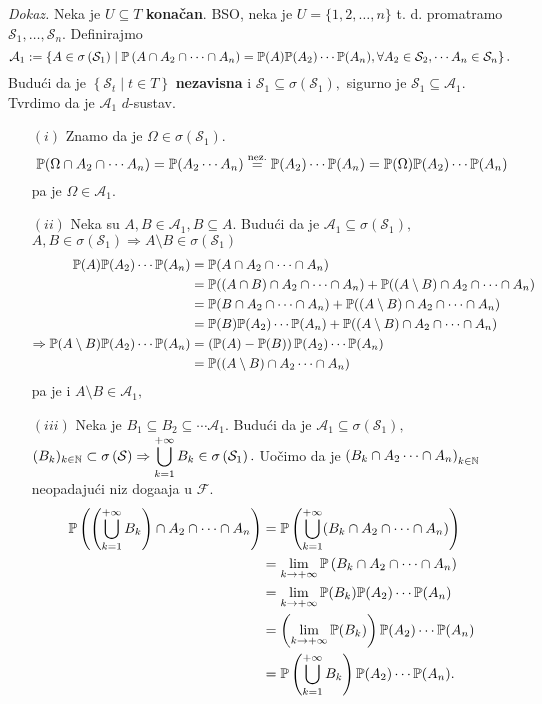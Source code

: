 \documentclass{article}
\begin{document}
\textit{Dokaz.}\newline 
Neka je \(U\subseteq T\) \textbf{konačan}. BSO, neka je \(U=\{1,2,\ldots,n\}\) t. d. promatramo \(\mathcal S_1,\ldots,\mathcal S_n.\) Definirajmo \[\mathcal A_1:=\left\{A\in\sigma\left(\mathcal S_1\right)\mid\Bbb P\left(A\cap A_2\cap\cdots\cap A_n\right)=\Bbb P(A)\Bbb P(A_2)\cdots\Bbb P(A_n),\forall A_2\in\mathcal S_2,\cdots A_n\in\mathcal S_n\right\}.\] Budući da je \(\left\{\mathcal S_t\mid t\in T\right\}\) \textbf{nezavisna} i \(\mathcal S_1\subseteq\sigma\left(\mathcal S_1\right),\) sigurno je \(\mathcal S_1\subseteq\mathcal A_1.\) Tvrdimo da je \(\mathcal A_1\) \(d\)-sustav. \begin{enumerate}
    \item[\((i)\)] Znamo da je \(\Omega\in\sigma\left(\mathcal S_1\right).\) \[\Bbb P(\Omega\cap A_2\cap\cdots A_n)=\Bbb P(A_2\cdots A_n)\overset{\text{nez.}}{=}\Bbb P(A_2)\cdots\Bbb P(A_n)=\Bbb P(\Omega)\Bbb P(A_2)\cdots\Bbb P(A_n)\] pa je \(\Omega\in\mathcal A_1.\)
    \item[\((ii)\)] Neka su \(A,B\in\mathcal A_1,B\subseteq A.\) Budući da je \(\mathcal A_1\subseteq\sigma\left(\mathcal S_1\right),\) \(A,B\in\sigma\left(\mathcal S_1\right)\Rightarrow A\setminus B\in\sigma\left(\mathcal S_1\right)\) \[\begin{aligned}\Bbb P(A)\Bbb P(A_2)\cdots\Bbb P(A_n)&=\Bbb P(A\cap A_2\cap\cdots\cap A_n)\\&=\Bbb P((A\cap B)\cap A_2\cap\cdots\cap A_n)+\Bbb P((A\setminus B)\cap A_2\cap\cdots\cap A_n)\\&=\Bbb P(B\cap A_2\cap\cdots\cap A_n)+\Bbb P((A\setminus B)\cap A_2\cap\cdots\cap A_n)\\&=\Bbb P(B)\Bbb P(A_2)\cdots\Bbb P(A_n)+\Bbb P((A\setminus B)\cap A_2\cap\cdots\cap A_n)\\\Rightarrow\Bbb P(A\setminus B)\Bbb P(A_2)\cdots\Bbb P(A_n)&=\left(\Bbb P(A)-\Bbb P(B)\right)\Bbb P(A_2)\cdots\Bbb P(A_n)\\&=\Bbb P((A\setminus B)\cap A_2\cdots\cap A_n)\end{aligned}\] pa je i \(A\setminus B\in\mathcal A_1,\)
    \item[\((iii)\)] Neka je \(B_1\subseteq B_2\subseteq\cdots\mathcal A_1.\) Budući da je \(\mathcal A_1\subseteq\sigma\left(\mathcal S_1\right),\) \((B_k)_{k\in\Bbb N}\subset\sigma\left(\mathcal S\right)\Rightarrow\displaystyle\bigcup_{k=1}^{+\infty}B_k\in\sigma\left(\mathcal S_1\right).\) Uočimo da je \(\left(B_k\cap A_2\cdots\cap A_n\right)_{k\in\Bbb N}\) neopadajući niz doga\dj{}aja u \(\mathcal F.\)\[\begin{aligned}\Bbb P\left(\left(\bigcup_{k=1}^{+\infty}B_k\right)\cap A_2\cap\cdots\cap A_n\right)&=\Bbb P\left(\bigcup_{k=1}^{+\infty}(B_k\cap A_2\cap\cdots\cap A_n)\right)\\&=\lim_{k\to+\infty}\Bbb P\left(B_k\cap A_2\cap\cdots\cap A_n\right)\\&=\lim_{k\to+\infty}\Bbb P(B_k)\Bbb P(A_2)\cdots\Bbb P(A_n)\\&=\left(\lim_{k\to+\infty}\Bbb P(B_k)\right)\Bbb P(A_2)\cdots\Bbb P(A_n)\\&=\Bbb P\left(\bigcup_{k=1}^{+\infty}B_k\right)\Bbb P(A_2)\cdots\Bbb P(A_n).\end{aligned}\]

\end{enumerate}
\end{document}
